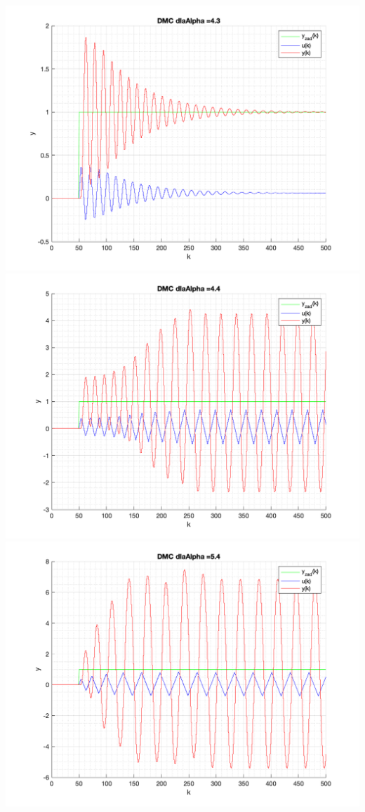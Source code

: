 \documentclass[a4paper, 11pt]{article}
\begin{document}
\begin{enumerate}
 \includegraphics[width=\linewidth]{./ModelsDodatkowe_Alpha/P4_DMC_Alpha_4_3_png.png} 
 \includegraphics[width=\linewidth]{./ModelsDodatkowe_Alpha/P4_DMC_Alpha_4_4_png.png} 
 \includegraphics[width=\linewidth]{./ModelsDodatkowe_Alpha/P4_DMC_Alpha_5_4_png.png} 

\end{enumerate}
\end{document}
